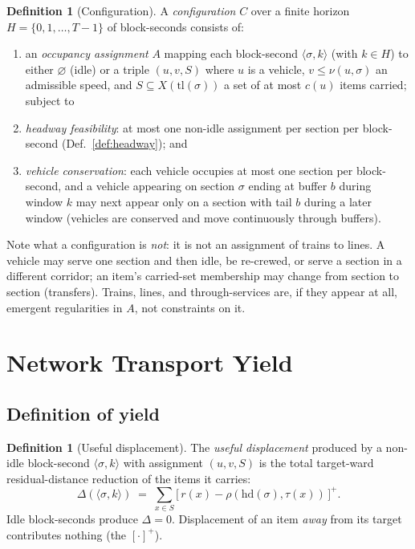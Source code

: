 \documentclass[11pt,twocolumn,a4paper]{article}
\theoremstyle{definition}
\newtheorem{definition}[theorem]{Definition}
\theoremstyle{remark}
\begin{document}
\begin{definition}[Configuration]
\label{def:config}
A \emph{configuration} $C$ over a finite horizon $H = \{0,1,\dots,T-1\}$ of block-seconds consists of:
\begin{enumerate}[nosep]
\item an \emph{occupancy assignment} $A$ mapping each block-second $\langle\sigma,k\rangle$ (with $k\in H$) to either $\varnothing$ (idle) or a triple $(u,v,S)$ where $u$ is a vehicle, $v\le\nu(u,\sigma)$ an admissible speed, and $S\subseteq X(\mathrm{tl}(\sigma))$ a set of at most $c(u)$ items carried; subject to
\item \emph{headway feasibility}: at most one non-idle assignment per section per block-second (Def.~\ref{def:headway}); and
\item \emph{vehicle conservation}: each vehicle occupies at most one section per block-second, and a vehicle appearing on section $\sigma$ ending at buffer $b$ during window $k$ may next appear only on a section with tail $b$ during a later window (vehicles are conserved and move continuously through buffers).
\end{enumerate}
\end{definition}

Note what a configuration is \emph{not}: it is not an assignment of trains to lines. A vehicle may serve one section and then idle, be re-crewed, or serve a section in a different corridor; an item's carried-set membership may change from section to section (transfers). Trains, lines, and through-services are, if they appear at all, emergent regularities in $A$, not constraints on it.

\section{Network Transport Yield}

\subsection{Definition of yield}

\begin{definition}[Useful displacement]
\label{def:useful}
The \emph{useful displacement} produced by a non-idle block-second $\langle\sigma,k\rangle$ with assignment $(u,v,S)$ is the total target-ward residual-distance reduction of the items it carries:
\begin{equation}
\label{eq:useful}
\Delta(\langle\sigma,k\rangle) \;=\; \sum_{x\in S} \big[\, r(x) - \rho(\mathrm{hd}(\sigma),\tau(x)) \,\big]^{+}.
\end{equation}
Idle block-seconds produce $\Delta = 0$. Displacement of an item \emph{away} from its target contributes nothing (the $[\cdot]^+$).
\end{definition}
\end{document}

